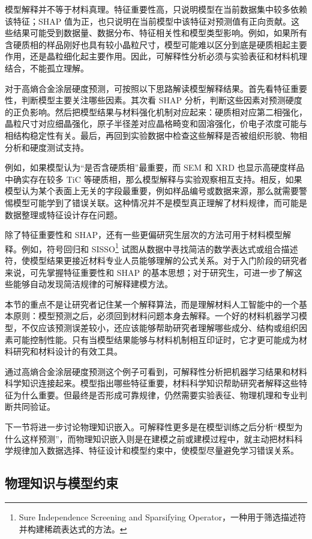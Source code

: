 模型解释并不等于材料真理。特征重要性高，只说明模型在当前数据集中较多依赖该特征；SHAP 值为正，也只说明在当前模型中该特征对预测值有正向贡献。这些结果可能受到数据量、数据分布、特征相关性和模型类型影响。例如，如果所有含硬质相的样品刚好也具有较小晶粒尺寸，模型可能难以区分到底是硬质相起主要作用，还是晶粒细化起主要作用。因此，可解释性分析必须与实验表征和材料机理结合，不能孤立理解。


对于高熵合金涂层硬度预测，可按照以下思路解读模型解释结果。首先看特征重要性，判断模型主要关注哪些因素。其次看 SHAP 分析，判断这些因素对预测硬度的正负影响。然后把模型结果与材料强化机制对应起来：硬质相对应第二相强化，晶粒尺寸对应细晶强化，原子半径差对应晶格畸变和固溶强化，价电子浓度可能与相结构稳定性有关。最后，再回到实验数据中检查这些解释是否被组织形貌、物相分析和硬度测试支持。


例如，如果模型认为“是否含硬质相”最重要，而 SEM 和 XRD 也显示高硬度样品中确实存在较多 TiC 等硬质相，那么模型解释与实验观察相互支持。相反，如果模型认为某个表面上无关的字段最重要，例如样品编号或数据来源，那么就需要警惕模型可能学到了错误关联。这种情况并不是模型真正理解了材料规律，而可能是数据整理或特征设计存在问题。


除了特征重要性和 SHAP，还有一些更偏研究生层次的方法可用于材料模型解释。例如，符号回归和 SISSO\footnote{Sure Independence Screening and Sparsifying Operator，一种用于筛选描述符并构建稀疏表达式的方法。} 试图从数据中寻找简洁的数学表达式或组合描述符，使模型结果更接近材料专业人员能够理解的公式关系。对于入门阶段的研究者来说，可先掌握特征重要性和 SHAP 的基本思想；对于研究生，可进一步了解这些能够自动发现简洁规律的可解释建模方法。


本节的重点不是让研究者记住某一个解释算法，而是理解材料人工智能中的一个基本原则：模型预测之后，必须回到材料问题本身去解释。一个好的材料机器学习模型，不仅应该预测误差较小，还应该能够帮助研究者理解哪些成分、结构或组织因素可能控制性能。只有当模型结果能够与材料机制相互印证时，它才更可能成为材料研究和材料设计的有效工具。


通过高熵合金涂层硬度预测这个例子可看到，可解释性分析把机器学习结果和材料科学知识连接起来。模型指出哪些特征重要，材料科学知识帮助研究者解释这些特征为什么重要。但最终是否形成可靠规律，仍然需要实验表征、物理机理和专业判断共同验证。


下一节将进一步讨论物理知识嵌入。可解释性更多是在模型训练之后分析“模型为什么这样预测”，而物理知识嵌入则是在建模之前或建模过程中，就主动把材料科学规律加入数据选择、特征设计和模型约束中，使模型尽量避免学习错误关系。


\subsection{物理知识与模型约束}

